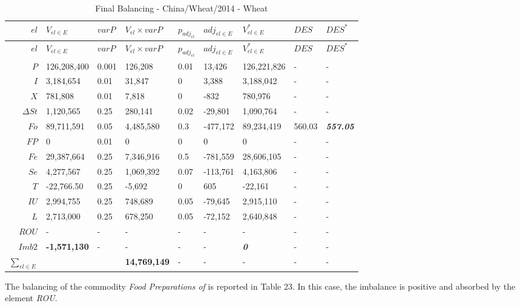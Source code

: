 \documentclass[]{article}
\begin{document}
\begin{longtable}[]{@{}rllllllll@{}}
\caption{Final Balancing - China/Wheat/2014 - Wheat}\tabularnewline
\toprule
\boldmath\(el\) & \boldmath\(V_{el \in E}\) & \boldmath\(varP\) &
\boldmath\(V_{el} \times varP\) & \boldmath\(p_{adj_{el}}\) &
\boldmath\(adj_{el \in E}\) & \boldmath\(V^*_{el \in E}\) &
\boldmath\(DES\) & \boldmath\(DES^*\)\tabularnewline
\midrule
\endfirsthead
\toprule
\boldmath\(el\) & \boldmath\(V_{el \in E}\) & \boldmath\(varP\) &
\boldmath\(V_{el} \times varP\) & \boldmath\(p_{adj_{el}}\) &
\boldmath\(adj_{el \in E}\) & \boldmath\(V^*_{el \in E}\) &
\boldmath\(DES\) & \boldmath\(DES^*\)\tabularnewline
\midrule
\endhead
\(P\) & 126,208,400 & 0.001 & 126,208 & 0.01 & 13,426 & 126,221,826 & -
& -\tabularnewline
\(I\) & 3,184,654 & 0.01 & 31,847 & 0 & 3,388 & 3,188,042 & - &
-\tabularnewline
\(X\) & 781,808 & 0.01 & 7,818 & 0 & -832 & 780,976 & - &
-\tabularnewline
\(\Delta St\) & 1,120,565 & 0.25 & 280,141 & 0.02 & -29,801 & 1,090,764
& - & -\tabularnewline
\(Fo\) & 89,711,591 & 0.05 & 4,485,580 & 0.3 & -477,172 & 89,234,419 &
560.03 & \textbf{\emph{557.05}}\tabularnewline
\(FP\) & 0 & 0.01 & 0 & 0 & 0 & 0 & - & -\tabularnewline
\(Fe\) & 29,387,664 & 0.25 & 7,346,916 & 0.5 & -781,559 & 28,606,105 & -
& -\tabularnewline
\(Se\) & 4,277,567 & 0.25 & 1,069,392 & 0.07 & -113,761 & 4,163,806 & -
& -\tabularnewline
\(T\) & -22,766.50 & 0.25 & -5,692 & 0 & 605 & -22,161 & - &
-\tabularnewline
\(IU\) & 2,994,755 & 0.25 & 748,689 & 0.05 & -79,645 & 2,915,110 & - &
-\tabularnewline
\(L\) & 2,713,000 & 0.25 & 678,250 & 0.05 & -72,152 & 2,640,848 & - &
-\tabularnewline
\(ROU\) & - & - & - & - & - & - & - & -\tabularnewline
\boldmath\(Imb2\) & \textbf{-1,571,130} & - & - & - & - &
\textbf{\emph{0}} & - & -\tabularnewline
\boldmath\(\sum \limits_{el \in E}\) & & & \textbf{14,769,149} & - & - &
- & - & -\tabularnewline
\bottomrule
\end{longtable}

The balancing of the commodity \emph{Food Preparations of} is reported
in Table 23. In this case, the imbalance is positive and absorbed by the
element \emph{ROU}.

\newpage
\end{document}
